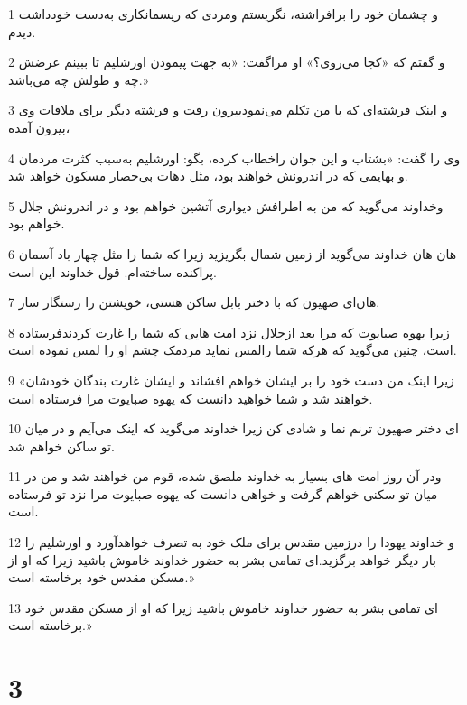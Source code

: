 \par 1 و چشمان خود را برافراشته، نگریستم ومردی که ریسمانکاری به‌دست خودداشت دیدم.
\par 2 و گفتم که «کجا می‌روی؟» او مراگفت: «به جهت پیمودن اورشلیم تا ببینم عرضش چه و طولش چه می‌باشد.»
\par 3 و اینک فرشته‌ای که با من تکلم می‌نمودبیرون رفت و فرشته دیگر برای ملاقات وی بیرون آمده،
\par 4 وی را گفت: «بشتاب و این جوان راخطاب کرده، بگو: اورشلیم به‌سبب کثرت مردمان و بهایمی که در اندرونش خواهند بود، مثل دهات بی‌حصار مسکون خواهد شد.
\par 5 وخداوند می‌گوید که من به اطرافش دیواری آتشین خواهم بود و در اندرونش جلال خواهم بود.
\par 6 هان هان خداوند می‌گوید از زمین شمال بگریزید زیرا که شما را مثل چهار باد آسمان پراکنده ساخته‌ام. قول خداوند این است.
\par 7 هان‌ای صهیون که با دختر بابل ساکن هستی، خویشتن را رستگار ساز.
\par 8 زیرا یهوه صبایوت که مرا بعد ازجلال نزد امت هایی که شما را غارت کردندفرستاده است، چنین می‌گوید که هر‌که شما رالمس نماید مردمک چشم او را لمس نموده است.
\par 9 «زیرا اینک من دست خود را بر ایشان خواهم افشاند و ایشان غارت بندگان خودشان خواهند شد و شما خواهید دانست که یهوه صبایوت مرا فرستاده است.
\par 10 ‌ای دختر صهیون ترنم نما و شادی کن زیرا خداوند می‌گوید که اینک می‌آیم و در میان تو ساکن خواهم شد.
\par 11 ودر آن روز امت های بسیار به خداوند ملصق شده، قوم من خواهند شد و من در میان تو سکنی خواهم گرفت و خواهی دانست که یهوه صبایوت مرا نزد تو فرستاده است.
\par 12 و خداوند یهودا را درزمین مقدس برای ملک خود به تصرف خواهدآورد و اورشلیم را بار دیگر خواهد برگزید.‌ای تمامی بشر به حضور خداوند خاموش باشید زیرا که او از مسکن مقدس خود برخاسته است.»
\par 13 ‌ای تمامی بشر به حضور خداوند خاموش باشید زیرا که او از مسکن مقدس خود برخاسته است.»

\chapter{3}

